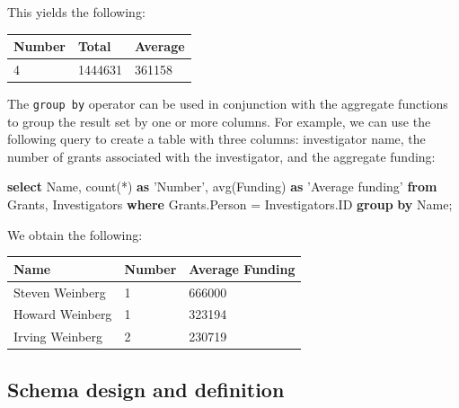 \documentclass[]{krantz}
\newenvironment{Shaded}{\begin{snugshade}}{\end{snugshade}}
\newcommand{\KeywordTok}[1]{\textcolor[rgb]{0.13,0.29,0.53}{\textbf{#1}}}
\newcommand{\StringTok}[1]{\textcolor[rgb]{0.31,0.60,0.02}{#1}}
\newcommand{\FunctionTok}[1]{\textcolor[rgb]{0.00,0.00,0.00}{#1}}
\newcommand{\NormalTok}[1]{#1}
\begin{document}
This yields the following:

\begin{longtable}[]{@{}lll@{}}
\toprule
\textbf{Number} & \textbf{Total} & \textbf{Average}\tabularnewline
\midrule
\endhead
4 & 1444631 & 361158\tabularnewline
\bottomrule
\end{longtable}

The \texttt{group\ by} operator can be used in conjunction with the
aggregate functions to group the result set by one or more columns. For
example, we can use the following query to create a table with three
columns: investigator name, the number of grants associated with the
investigator, and the aggregate funding:

\begin{Shaded}
\begin{Highlighting}[]
\KeywordTok{select}\NormalTok{ Name, }\FunctionTok{count}\NormalTok{(*) }\KeywordTok{as} \StringTok{'Number'}\NormalTok{,}
       \FunctionTok{avg}\NormalTok{(Funding) }\KeywordTok{as} \StringTok{'Average funding'}
\KeywordTok{from}\NormalTok{ Grants, Investigators}
\KeywordTok{where}\NormalTok{ Grants.Person = Investigators.ID}
\KeywordTok{group} \KeywordTok{by}\NormalTok{ Name;}
\end{Highlighting}
\end{Shaded}

We obtain the following:

\begin{longtable}[]{@{}lll@{}}
\toprule
\textbf{Name} & \textbf{Number} & \textbf{Average
Funding}\tabularnewline
\midrule
\endhead
Steven Weinberg & 1 & 666000\tabularnewline
Howard Weinberg & 1 & 323194\tabularnewline
Irving Weinberg & 2 & 230719\tabularnewline
\bottomrule
\end{longtable}

\hypertarget{sec:db:schema}{\subsection{Schema design and
definition}\label{sec:db:schema}}
\end{document}
